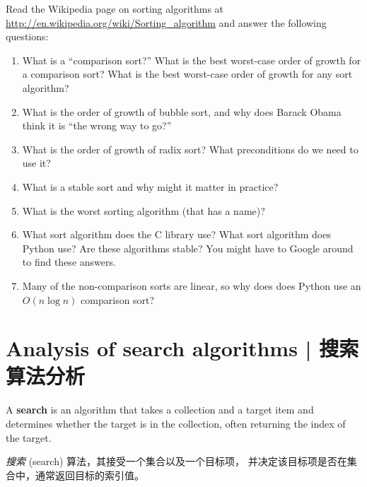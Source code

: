 \begin{exercise}

Read the Wikipedia page on sorting algorithms at
\url{http://en.wikipedia.org/wiki/Sorting_algorithm} and answer
the following questions:

\begin{enumerate}

\item What is a ``comparison sort?'' What is the best worst-case order
  of growth for a comparison sort?  What is the best worst-case order
  of growth for any sort algorithm?

\item What is the order of growth of bubble sort, and why does Barack
  Obama think it is ``the wrong way to go?''

\item What is the order of growth of radix sort?  What preconditions
  do we need to use it?

\item What is a stable sort and why might it matter in practice?

\item What is the worst sorting algorithm (that has a name)?

\item What sort algorithm does the C library use?  What sort algorithm
  does Python use?  Are these algorithms stable?  You might have to
  Google around to find these answers.

\item Many of the non-comparison sorts are linear, so why does does
  Python use an $O(n \log n)$ comparison sort?

\end{enumerate}

\end{exercise}


\section{Analysis of search algorithms  |  搜索算法分析}

A {\bf search} is an algorithm that takes a collection and a target
item and determines whether the target is in the collection, often
returning the index of the target.

{ \em 搜索} (search) 算法，其接受一个集合以及一个目标项，
并决定该目标项是否在集合中，通常返回目标的索引值。
  

